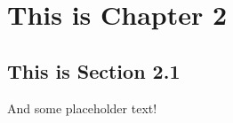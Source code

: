 \chapter{This is Chapter 2}

\section{This is Section 2.1}

\begin{spacing}{2.0}

    And some placeholder text!

\end{spacing}
